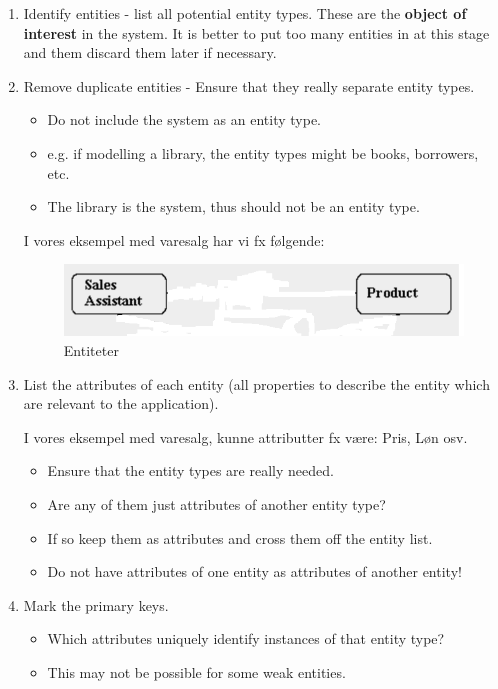 \begin{enumerate}
	\item Identify entities - list all potential entity types. These are the \textbf{object of interest} in the system. It is better to put too many entities in at this stage and them discard them later if necessary.
	\item Remove duplicate entities - Ensure that they really separate entity types.
	
	\begin{itemize}
		\item Do not include the system as an entity type. \item e.g. if modelling a library, the entity types might be books, borrowers, etc.
		\item The library is the system, thus should not be an entity type.
	\end{itemize}
	
	I vores eksempel med varesalg har vi fx følgende:
	\begin{figure}[H]
		\centering
		\includegraphics[width=0.7\linewidth]{figs/spm1/salesProductEntities.png}
		\caption{Entiteter}
		\label{fig:salesProductEntities}
	\end{figure}

	
	\item List the attributes of each entity (all properties to describe the entity which are relevant to the application).
	
	I vores eksempel med varesalg, kunne attributter fx være: Pris, Løn osv.
	
	\begin{itemize}
		\item Ensure that the entity types are really needed.
		\item Are any of them just attributes of another entity type?
		\item If so keep them as attributes and cross them off the entity list.
		\item Do not have attributes of one entity as attributes of another entity!
	\end{itemize}
	
	\item Mark the primary keys.
	
	\begin{itemize}
		\item Which attributes uniquely identify instances of that entity type?
		\item This may not be possible for some weak entities.
	\end{itemize}
	

\end{enumerate}

